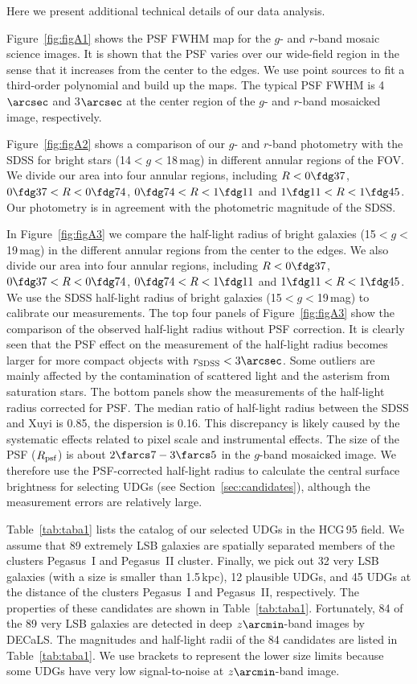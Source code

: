 \documentclass[twocolumn,trackchanges]{aastex61}
\begin{document}
\clearpage
\appendix

Here we present additional technical details of our data analysis. 

Figure~\ref{fig:figA1} shows the PSF FWHM map for the $g$- and $r$-band mosaic science images. It is shown that the PSF varies over our wide-field region in the sense that it increases from the center to the edges. We use point sources to fit a third-order polynomial and build up the maps. The typical PSF FWHM is 4$\arcsec$ and 3$\arcsec$ at the center region of the $g$- and $r$-band mosaicked image, respectively.

Figure~\ref{fig:figA2} shows a comparison of our $g$- and $r$-band photometry with the SDSS for bright stars (14$< g <$18\,mag) in different annular regions of the FOV. We divide our area into four annular regions, including $R < 0\fdg37$, $0\fdg37 < R < 0\fdg74$, $0\fdg74 < R < 1\fdg11$ and $1\fdg11 < R < 1\fdg45$. Our photometry is in agreement with the photometric magnitude of the SDSS.


In Figure~\ref{fig:figA3} we compare the half-light radius of bright galaxies (15$< g <$19\,mag) in the different annular regions from the center to the edges.  We also divide our area into four annular regions, including $R < 0\fdg37$, $0\fdg37 < R < 0\fdg74$, $0\fdg74 < R < 1\fdg11$ and $1\fdg11 < R < 1\fdg45$. We use the SDSS half-light radius of bright galaxies (15$< g <$19\,mag) to calibrate our measurements. The top four panels of Figure~\ref{fig:figA3} show the comparison of the observed half-light radius without PSF correction. It is clearly seen that the PSF effect on the measurement of the half-light radius becomes larger for more compact objects with $r_{\rm SDSS} < 3\arcsec$. Some outliers are mainly affected by the contamination of scattered light and the asterism from saturation stars. 
The bottom panels show the measurements of the half-light radius corrected for PSF. The median ratio of half-light radius between the SDSS and Xuyi is 0.85, the dispersion is 0.16. This discrepancy is likely caused by the systematic effects related to pixel scale and instrumental effects. The size of the PSF ($ R_{\rm psf}$) is about $2\farcs7 - 3\farcs5$ in the $g$-band mosaicked image. We therefore use the PSF-corrected half-light radius to calculate the central surface brightness for selecting UDGs (see Section~\ref{sec:candidates}), although the measurement errors are relatively large. 

Table~\ref{tab:taba1} lists the catalog of our selected UDGs in the HCG\,95 field. We assume that 89 extremely LSB galaxies are spatially separated members of the clusters Pegasus~I and Pegasus~II cluster. Finally, we pick out 32 very LSB galaxies (with a size is smaller than 1.5\,kpc), 12 plausible UDGs, and 45 UDGs at the distance of the clusters Pegasus~I and Pegasus~II, respectively.
The properties of these candidates are shown in Table~\ref{tab:taba1}. Fortunately, 84 of the 89 very LSB galaxies are detected in deep $z\arcmin$-band images by DECaLS. The magnitudes and half-light radii of the 84 candidates are listed in Table~\ref{tab:taba1}. We use brackets to represent the lower size limits because some UDGs have very low signal-to-noise at $z\arcmin$-band image.
\end{document}
